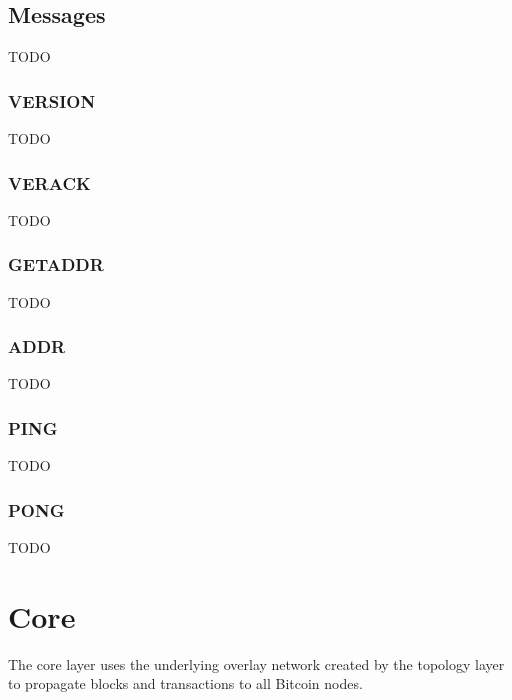 \subsection{Messages}
TODO

\subsubsection{VERSION}
\label{par:version}
TODO

\subsubsection{VERACK}
TODO

\subsubsection{GETADDR}
TODO

\subsubsection{ADDR}
TODO

\subsubsection{PING}
TODO

\subsubsection{PONG}
TODO


\section{Core}
The core layer uses the underlying overlay network created by the topology layer to propagate blocks and transactions to all Bitcoin nodes.

